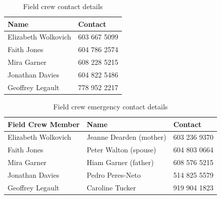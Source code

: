 \documentclass[11pt,letter]{article}
\begin{document}
\begin{table}[H]
\caption{Field crew contact details} %
\begin{tabular}{ l | l }  %
\hline\hline %
Name & Contact\\ [0.5ex] %
\hline %
Elizabeth Wolkovich & 603 667 5099\\ %
Faith Jones & 604 786 2574 \\
Mira Garner & 608 228 5215 \\
Jonathan Davies & 604 822 5486 \\
Geoffrey Legault & 778 952 2217 \\  
\hline %
\end{tabular}
\label{table:nonlin} %
\end{table}

\begin{table}[H]
\caption{Field crew emergency contact details} %
\begin{tabular}{l l l} %
\hline\hline %
Field Crew Member & Name & Contact\\ [0.5ex] %
\hline %
Elizabeth Wolkovich & Jeanne Dearden (mother) & 603 236 9370 \\ %
Faith Jones & Peter Walton (spouse) & 604 803 0664\\
Mira Garner & Hiam Garner (father) & 608 576 5215 \\
Jonathan Davies & Pedro Peres-Neto & 514 825 5579\\
Geoffrey Legault & Caroline Tucker & 919 904 1823 \\  
\hline %
\end{tabular}
\label{table:nonlin} %
\end{table}
\end{document}
